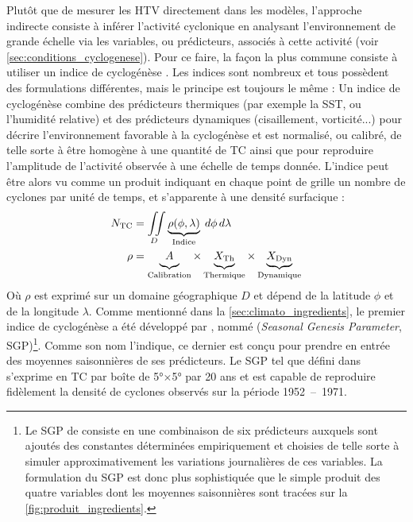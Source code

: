 \documentclass[../main.tex]{subfiles}
\begin{document}
Plutôt que de mesurer les HTV directement dans les modèles, l'approche indirecte consiste à inférer l'activité cyclonique en analysant l'environnement de grande
échelle via les variables, ou prédicteurs, associés à cette activité (voir \cref{sec:conditions_cyclogenese}). Pour ce faire, la façon la plus commune consiste à utiliser un indice de cyclogénèse
\parencite{camargo_tropical_2016}. Les indices sont nombreux et tous possèdent des formulations différentes, mais le principe est toujours le même : Un indice de
cyclogénèse combine des prédicteurs thermiques (par exemple la SST, ou l'humidité relative) et des prédicteurs dynamiques (cisaillement, vorticité...) pour
décrire l'environnement favorable à la cyclogénèse et est normalisé, ou calibré, de telle sorte à être homogène à une quantité de TC ainsi que pour reproduire l'amplitude de
l'activité observée à une échelle de temps donnée. L'indice peut être alors vu comme un produit indiquant en chaque point de grille un nombre de cyclones par
unité de temps, et s'apparente à une densité surfacique :
%
\begin{align*}
    N_{\text{TC}} &= \iint\limits_{D} \underbrace{\rho(\phi, \lambda)}_{\text{Indice}} \; d\phi \, d\lambda \\
    \rho &= \underbrace{\vphantom{X_{\text{Dyn}}}A}_{\text{Calibration}} \times \underbrace{\vphantom{X_{\text{Dyn}}}X_{\text{Th}}}_{\text{Thermique}} \times
    \underbrace{X_{\text{Dyn}}}_{\text{Dynamique}}
\end{align*}
%
Où $\rho$ est exprimé sur un domaine géographique $D$ et dépend de la latitude $\phi$ et de la longitude $\lambda$. Comme mentionné dans la
\cref{sec:climato_ingredients}, le premier indice de cyclogénèse a été développé par \cite{gray_tropical_1975}, nommé  (\textit{Seasonal Genesis Parameter}, SGP)\footnote{Le SGP de \cite{gray_tropical_1975} consiste en une combinaison de six prédicteurs auxquels
sont ajoutés des constantes déterminées empiriquement et choisies de telle sorte à simuler approximativement les variations journalières de ces variables. La
formulation du SGP est donc plus sophistiquée que le simple produit des quatre variables dont les moyennes saisonnières sont tracées sur la
\cref{fig:produit_ingredients}.}. Comme son nom l'indique, ce dernier est conçu pour prendre en entrée des moyennes saisonnières de ses
prédicteurs. Le SGP tel que défini dans \cite{gray_tropical_1975} s'exprime en TC par boîte de \ang{5}$\times$\ang{5} par 20 ans et est capable de reproduire
fidèlement la densité de cyclones observés sur la période \num{1952}~--~\num{1971}.
\end{document}
